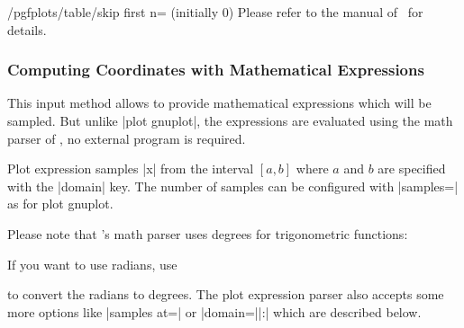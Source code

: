 {\begin{key}{/pgfplots/table/skip first n= (initially 0)}
	Please refer to the manual of \PGFPlotstable\ for details.
\end{key}


\subsubsection{Computing Coordinates with Mathematical Expressions}

\begin{addplotoperation}[]{}{}
	This input method allows to provide mathematical expressions which will be sampled. But unlike |plot gnuplot|, the expressions are evaluated using the math parser of \PGF, no external program is required.

	Plot expression samples |x| from the interval $[a,b]$ where $a$ and $b$ are specified with the |domain| key. The number of samples can be configured with |samples=| as for plot gnuplot.

\begin{codeexample}[]
\end{codeexample}

Please note that \PGF's math parser uses degrees for trigonometric functions:
\begin{codeexample}[]
\end{codeexample}
\noindent If you want to use radians, use 
\begin{codeexample}[]
\end{codeexample}
\noindent to convert the radians to degrees. The plot expression parser also accepts some more options like |samples at=| or |domain=||:| which are described below.


\end{addplotoperation}}

